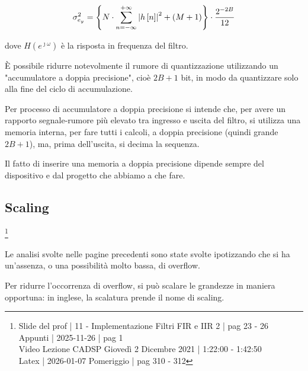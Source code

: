 {
    \Large 
    \begin{equation}
        \sigma_{e_y}^{2} 
        = 
        \left\{
            N \cdot \sum_{n = - \infty}^{+ \infty} \abs{h \left[ n\right]}^{2} + \left(M + 1\right)
        \right\}
        \cdot 
        \dfrac{2^{-2B}}{12}
    \end{equation}
}

dove $H \left(e^{\jmath \omega}\right)$ è la risposta in frequenza del filtro. \newline 

È possibile ridurre notevolmente il rumore di quantizzazione utilizzando un "accumulatore a doppia precisione", cioè $2B + 1$ bit, 
in modo da quantizzare solo alla fine del ciclo di accumulazione. \newline 

Per processo di accumulatore a doppia precisione si intende che, per avere un rapporto segnale-rumore più elevato tra ingresso e uscita del filtro, 
si utilizza una memoria interna, per fare tutti i calcoli, a doppia precisione (quindi grande $2 B + 1$), ma, prima dell'uscita, si decima la sequenza. \newline 

\begin{tcolorbox}
    Il fatto di inserire una memoria a doppia precisione dipende sempre del dispositivo e dal progetto che abbiamo a che fare. 
\end{tcolorbox}

\newpage 

\subsection{Scaling}

\footnote{ 
    Slide del prof | 11 - Implementazione Filtri FIR e IIR 2 | pag 23 - 26\\
    Appunti | 2025-11-26 | pag 1 \\ 
    Video Lezione CADSP Giovedì 2 Dicembre 2021 | 1:22:00 - 1:42:50 \\
    Latex | 2026-01-07 Pomeriggio | pag 310 - 312          
} 

Le analisi svolte nelle pagine precedenti sono state svolte ipotizzando che si ha un'assenza, o una possibilità molto bassa, di overflow. \newline 

Per ridurre l'occorrenza di overflow, si può scalare le grandezze in maniera opportuna: in inglese, la scalatura prende il nome di scaling. \newline 

